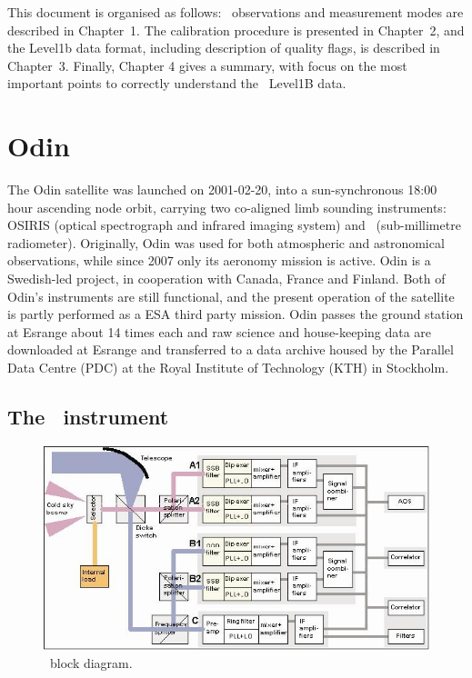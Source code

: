 This document is organised as follows:
\smr\ observations and measurement modes are described 
in Chapter~1. The calibration procedure is presented in
Chapter~2, and the Level1b data format, including description
of quality flags, is described in Chapter~3.
Finally,
Chapter 4 gives a summary, with focus on the most important points to correctly
understand the \smr\ Level1B data. 
   

\section{Odin}

The Odin satellite was launched on 2001-02-20, into a sun-synchronous
18:00 hour ascending node orbit, carrying two co-aligned limb sounding
instruments: OSIRIS (optical spectrograph and infrared imaging system) and
\SMR\ (sub-millimetre radiometer). Originally, Odin was used for both
atmospheric and astronomical observations, while since 2007 only its aeronomy
mission is active. Odin is a Swedish-led project, in cooperation with Canada,
France and Finland. Both of Odin's instruments are still functional, and the
present operation of the satellite is partly performed as a ESA third party
mission.
Odin passes the ground station at Esrange about 14 times each
and raw science and house-keeping data are downloaded at
Esrange and transferred to a data archive housed by the Parallel
Data Centre (PDC) at the Royal Institute of Technology (KTH)
in Stockholm.


\subsection{The \SMR\ instrument}

\begin{figure}[t]
\includegraphics[width=14cm]{Odin_Auto2.jpg}
\caption{\smr\ block diagram.}
\label{fig:blockdiagram}
\end{figure}



